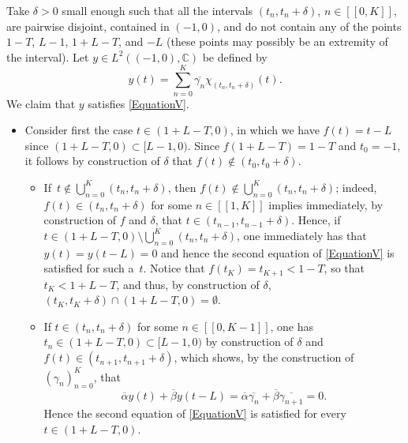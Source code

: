 \documentclass[10pt]{amsart}
\newcommand{\llbracket}{[\![}
\newcommand{\rrbracket}{]\!]}
\theoremstyle{plain}
\theoremstyle{definition}
\begin{document}
Take $\delta > 0$ small enough such that all the intervals $(t_n, t_n + \delta)$, $n \in \llbracket 0, K\rrbracket$, are pairwise disjoint, contained in $(-1, 0)$, and do not contain any of the points $1 - T$, $L - 1$, $1 + L - T$, and $-L$ (these points may possibly be an extremity of the interval). Let $y \in L^2((-1, 0), \mathbb C)$ be defined by
\begin{equation}
\label{DefV}
y(t) = \sum_{n=0}^K \overline{\gamma_n} \chi_{(t_n, t_n + \delta)}(t).
\end{equation}
We claim that $y$ satisfies \eqref{EquationV}.
\begin{itemize}
\item
Consider first the case $t \in (1 + L - T, 0)$, in which we have $f(t) = t - L$ since $(1 + L - T, 0) \subset [L - 1, 0)$. Since $f(1 + L - T) = 1 - T$ and $t_0 = -1$, it follows by construction of $\delta$ that $f(t) \notin (t_0, t_0 + \delta)$.
\begin{itemize}
\item
If~\hbox{$t \!\notin\! \bigcup_{n=0}^K (t_n, t_n + \delta)$}, then $f(t) \!\notin\! \bigcup_{n=0}^K (t_n, t_n + \delta)$; indeed, $f(t) \!\in\! (t_n, t_n + \delta)$ for some $n \in \llbracket 1, K\rrbracket$ implies immediately, by construction of $f$ and $\delta$, that \hbox{$t \in (t_{n-1}, t_{n-1} + \delta)$}. Hence, if \hbox{$t \in (1 + L - T, 0) \setminus \bigcup_{n=0}^K (t_n, t_n + \delta)$}, one immediately has that \hbox{$y(t) = y(t - L) = 0$} and hence the second equation of \eqref{EquationV} is satisfied for such a~$t$. Notice that $f(t_K) = t_{K+1} < 1 - T$, so that $t_K < 1 + L - T$, and thus, by construction of $\delta$, \hbox{$(t_K, t_K + \delta) \cap (1 + L - T, 0) = \emptyset$}.
\item
If $t \in (t_n, t_n + \delta)$ for some $n \in \llbracket 0, K - 1\rrbracket$, one has $t_n \in (1 + L - T, 0) \subset [L - 1, 0)$ by construction of $\delta$ and $f(t) \in (t_{n+1}, t_{n+1} + \delta)$, which shows, by the construction of $(\gamma_n)_{n=0}^K$, that
\[
\overline\alpha y(t) + \overline\beta y(t - L) = \overline\alpha \overline{\gamma_n} + \overline\beta \overline{\gamma_{n+1}} = 0.
\]
Hence the second equation of \eqref{EquationV} is satisfied for every $t \in (1 + L - T, 0)$.
\end{itemize}


\end{itemize}
\end{document}
